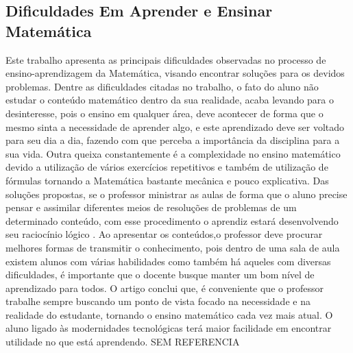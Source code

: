 \documentclass[12pt,a4paper]{article}
\begin{document}
\subsection{Dificuldades Em Aprender e Ensinar Matemática}
Este trabalho apresenta as principais dificuldades observadas no processo de ensino-aprendizagem da Matemática, visando encontrar soluções para os devidos problemas.
Dentre as dificuldades citadas no trabalho, o fato do aluno não estudar o conteúdo matemático dentro da sua realidade, acaba levando para o desinteresse, pois o ensino em qualquer área, deve acontecer de forma que o mesmo sinta a necessidade de aprender algo, e este aprendizado deve ser voltado para seu dia a dia, fazendo com que perceba a importância da disciplina para a sua vida. 
Outra queixa constantemente é a complexidade no ensino matemático devido a utilização de vários exercícios repetitivos e também de utilização de fórmulas tornando a Matemática bastante mecânica e pouco explicativa. 
Das soluções propostas, se o professor ministrar as aulas de forma que o aluno precise pensar e assimilar diferentes meios de resoluções de problemas de um determinado conteúdo, com esse procedimento o aprendiz estará desenvolvendo seu raciocínio lógico . Ao apresentar os conteúdos,o professor deve procurar melhores formas de transmitir o conhecimento, pois dentro de uma sala de aula existem alunos com várias habilidades como também há aqueles com diversas dificuldades, é importante que o docente busque manter um bom nível de aprendizado para todos.
O artigo conclui que, é conveniente que o professor trabalhe sempre buscando um ponto de vista focado na necessidade e na realidade do estudante, tornando o ensino matemático cada vez mais atual. O aluno ligado às modernidades tecnológicas terá maior facilidade em encontrar utilidade no que está aprendendo. SEM REFERENCIA
\end{document}
